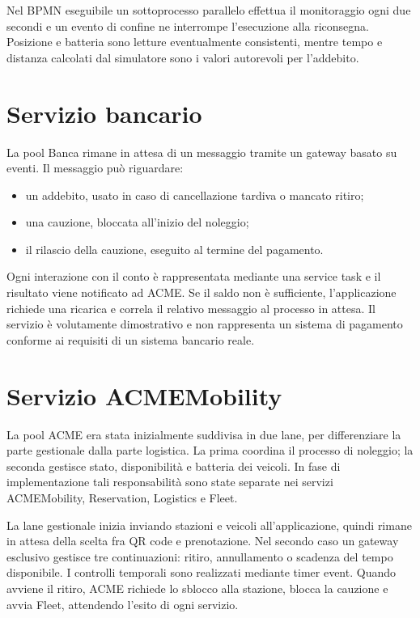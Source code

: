 \documentclass[12pt,a4paper,twoside]{report}
\begin{document}
Nel BPMN eseguibile un sottoprocesso parallelo effettua il monitoraggio ogni
due secondi e un evento di confine ne interrompe l'esecuzione alla
riconsegna. Posizione e batteria sono letture eventualmente consistenti,
mentre tempo e distanza calcolati dal simulatore sono i valori autorevoli per
l'addebito.

\section{Servizio bancario}

La pool Banca rimane in attesa di un messaggio tramite un gateway basato su
eventi. Il messaggio può riguardare:
\begin{itemize}
  \item un addebito, usato in caso di cancellazione tardiva o mancato ritiro;
  \item una cauzione, bloccata all'inizio del noleggio;
  \item il rilascio della cauzione, eseguito al termine del pagamento.
\end{itemize}
Ogni interazione con il conto è rappresentata mediante una service task e il
risultato viene notificato ad ACME. Se il saldo non è sufficiente,
l'applicazione richiede una ricarica e correla il relativo messaggio al
processo in attesa. Il servizio è volutamente dimostrativo e non rappresenta
un sistema di pagamento conforme ai requisiti di un sistema bancario reale.

\section{Servizio ACMEMobility}

La pool ACME era stata inizialmente suddivisa in due lane, per differenziare
la parte gestionale dalla parte logistica. La prima coordina il processo di
noleggio; la seconda gestisce stato, disponibilità e batteria dei veicoli.
In fase di implementazione tali responsabilità sono state separate nei
servizi ACMEMobility, Reservation, Logistics e Fleet.

La lane gestionale inizia inviando stazioni e veicoli all'applicazione, quindi
rimane in attesa della scelta fra QR code e prenotazione. Nel secondo caso un
gateway esclusivo gestisce tre continuazioni: ritiro, annullamento o scadenza
del tempo disponibile. I controlli temporali sono realizzati mediante timer
event. Quando avviene il ritiro, ACME richiede lo sblocco alla stazione,
blocca la cauzione e avvia Fleet, attendendo l'esito di ogni servizio.
\end{document}
